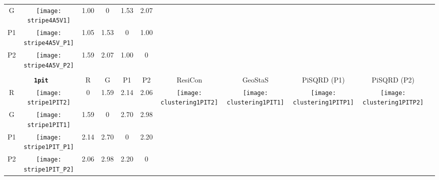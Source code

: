 \documentclass[a4paper,11pt,twoside]{book}%
\begin{document}
\begin{appendices}
\begin{sidewaystable}[h!]
\begin{tabular*}{4cm}{cc|c|c|c|c|c|c|c|c|c|}
\cline{1-6}
\multicolumn{1}{|c|}{G} & \texttt{[image: stripe4A5V1]} & 1.00 & 0 & 1.53 & 2.07 & \multirow{4}{*}{} & \multirow{4}{*}{} & \multirow{4}{*}{} & \multirow{4}{*}{} & \multirow{5}{*}{} \\
\cline{1-6}
\multicolumn{1}{|c|}{P1} & \texttt{[image: stripe4A5V\_P1]} & 1.05 & 1.53 & 0 & 1.00 & \multirow{4}{*}{} & \multirow{4}{*}{} & \multirow{4}{*}{} & \multirow{4}{*}{} & \multirow{5}{*}{}  \\
\cline{1-6}
\multicolumn{1}{|c|}{P2} & \texttt{[image: stripe4A5V\_P2]} & 1.59 & 2.07 & 1.00 & 0 & \multirow{4}{*}{} & \multirow{4}{*}{} & \multirow{4}{*}{} & \multirow{4}{*}{} & \multirow{5}{*}{}  \\
\cline{1-11}
\\
\cline{1-11}
\multicolumn{2}{|c|}{{\bf \texttt{1pit}}} & R & G & P1 & P2 & ResiCon & GeoStaS & PiSQRD (P1) & PiSQRD (P2) & \multirow{5}{*}{\vspace{-0.15cm}\texttt{[image: threeHistogram1PIT]}}  \\
\cline{1-10}
\multicolumn{1}{|c|}{R} & \texttt{[image: stripe1PIT2]} & 0 & 1.59 & 2.14 & 2.06 & \multirow{4}{*}{\vspace{-0.3cm}\texttt{[image: clustering1PIT2]}} & \multirow{4}{*}{\vspace{-0.3cm}\texttt{[image: clustering1PIT1]}} & \multirow{4}{*}{\vspace{-0.3cm}\texttt{[image: clustering1PITP1]}} & \multirow{4}{*}{\vspace{-0.3cm}\texttt{[image: clustering1PITP2]}} &  \multirow{5}{*}{} \\
\cline{1-6}
\multicolumn{1}{|c|}{G} & \texttt{[image: stripe1PIT1]} & 1.59 & 0 & 2.70 & 2.98 & \multirow{4}{*}{} & \multirow{4}{*}{} & \multirow{4}{*}{} & \multirow{4}{*}{} & \multirow{5}{*}{} \\
\cline{1-6}
\multicolumn{1}{|c|}{P1} & \texttt{[image: stripe1PIT\_P1]} & 2.14 & 2.70 & 0 & 2.20 & \multirow{4}{*}{} & \multirow{4}{*}{} & \multirow{4}{*}{} & \multirow{4}{*}{} & \multirow{5}{*}{}  \\
\cline{1-6}
\multicolumn{1}{|c|}{P2} & \texttt{[image: stripe1PIT\_P2]} & 2.06 & 2.98 & 2.20 & 0 & \multirow{4}{*}{} & \multirow{4}{*}{} & \multirow{4}{*}{} & \multirow{4}{*}{} & \multirow{5}{*}{}  \\
\cline{1-11}
\end{tabular*}
\normalfont
\end{sidewaystable}




\end{appendices}
\end{document}
